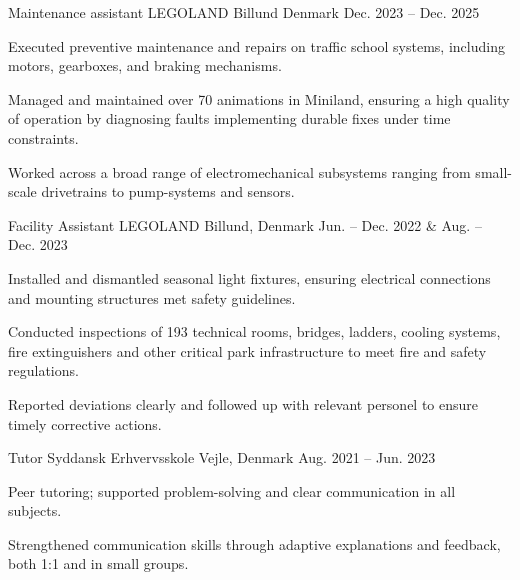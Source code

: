 

\begin{cventries}
  \cventry
    {Maintenance assistant} %
    {LEGOLAND} %
    {Billund Denmark} %
    {Dec. 2023 -- Dec. 2025} %
    {
      \begin{cvitems} %
        \item Executed preventive maintenance and repairs on traffic school systems, including motors, gearboxes, and braking mechanisms.
        \item Managed and maintained over 70 animations in Miniland, ensuring a high quality of operation by diagnosing faults implementing durable fixes under time constraints.
        \item Worked across a broad range of electromechanical subsystems ranging from small-scale drivetrains to pump-systems and sensors.
      \end{cvitems}
    }

  \cventry
    {Facility Assistant} %
    {LEGOLAND} %
    {Billund, Denmark} %
    { Jun. -- Dec. 2022 \& Aug. -- Dec. 2023} %
    {
      \begin{cvitems} %
        \item Installed and dismantled seasonal light fixtures, ensuring electrical connections and mounting structures met safety guidelines.
        \item Conducted inspections of 193 technical rooms, bridges, ladders, cooling systems, fire extinguishers and other critical park infrastructure to meet fire and safety regulations.
        \item Reported deviations clearly and followed up with relevant personel to ensure timely corrective actions.
      \end{cvitems}
    }

  \cventry
    {Tutor} %
    {Syddansk Erhvervsskole} %
    {Vejle, Denmark} %
    { Aug. 2021 -- Jun. 2023} %
    {
      \begin{cvitems} %
        \item Peer tutoring; supported problem-solving and clear communication in all subjects. 
        \item Strengthened communication skills through adaptive explanations and feedback, both 1:1 and in small groups.
      \end{cvitems}
    }
\end{cventries}
